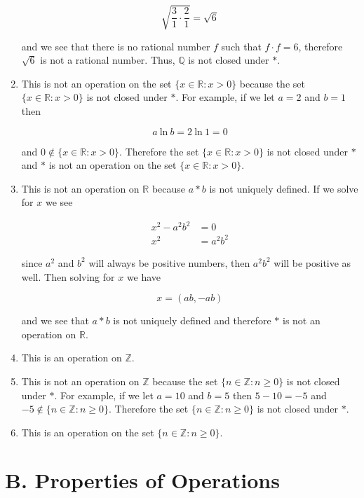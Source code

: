 \documentclass[12pt]{article}
\begin{document}
\begin{flushleft}
\begin{enumerate}
$$ \sqrt{ \frac{3}{1} \cdot \frac{2}{1} } = \sqrt{6}   $$

and we see that there is no rational number $f$ such that $f \cdot f = 6$, therefore $\sqrt{6}$ is not a rational number. Thus, $\mathbb{Q}$ is not closed under $*$.

\item This is not an operation on the set $\{x \in \mathbb{R}: x > 0\}$ because the set $\{x \in \mathbb{R}: x > 0\}$ is not closed under $*$. For example, if we let $a = 2$ and $b = 1$ then

$$ a~\text{ln}~b = 2~\text{ln}~1 = 0$$

and $ 0 \notin \{x \in \mathbb{R}: x > 0\}$. Therefore the set $\{x \in \mathbb{R}: x > 0\}$ is not closed under $*$ and $*$ is not an operation on the set $\{x \in \mathbb{R}: x > 0\}$.

\item This is not an operation on $\mathbb{R}$ because $a * b$ is not uniquely defined. If we solve for $x$ we see

\begin{align*}
x^{2} - a^{2}b^{2} &= 0 \\
x^{2} &= a^{2}b^{2}
\end{align*}

since $a^{2}$ and $b^{2}$ will always be positive numbers, then $a^{2}b^{2}$ will be positive as well. Then solving for $x$ we have

$$ x = \left( ab, - ab \right) $$

and we see that $a * b$ is not uniquely defined and therefore $*$ is not an operation on $\mathbb{R}$.

\item This is an operation on $\mathbb{Z}$.

\item This is not an operation on $\mathbb{Z}$ because the set $\{ n \in \mathbb{Z}:n \geq 0 \}$ is not closed under $*$. For example, if we let $a = 10$ and $b = 5$ then $5-10=-5$ and $-5 \notin \{ n \in \mathbb{Z}:n \geq 0 \}$. Therefore the set $\{ n \in \mathbb{Z}:n \geq 0 \}$ is not closed under $*$.

\item This is an operation on the set $\{ n \in \mathbb{Z}: n \geq 0 \}$.

\end{enumerate}


\section*{B. Properties of Operations}


\end{flushleft}
\end{document}
